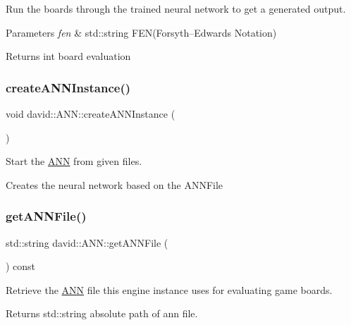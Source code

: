 Run the boards through the trained neural network to get a generated output.


\begin{DoxyParams}{Parameters}
{\em fen} & std\+::string F\+EN(Forsyth–\+Edwards Notation) \\
\hline
\end{DoxyParams}
\begin{DoxyReturn}{Returns}
int board evaluation 
\end{DoxyReturn}
\mbox{\label{classdavid_1_1ANN_ae5308d097ec9e78a740e24024dee5315}} 
\subsubsection{\texorpdfstring{create\+A\+N\+N\+Instance()}{createANNInstance()}}
{\footnotesize\ttfamily void david\+::\+A\+N\+N\+::create\+A\+N\+N\+Instance (\begin{DoxyParamCaption}{ }\end{DoxyParamCaption})}

Start the \hyperlink{classdavid_1_1ANN}{A\+NN} from given files.

Creates the neural network based on the A\+N\+N\+File \mbox{\label{classdavid_1_1ANN_aeef8f4fa5ab8fabf79db1351137322a6}} 
\subsubsection{\texorpdfstring{get\+A\+N\+N\+File()}{getANNFile()}}
{\footnotesize\ttfamily std\+::string david\+::\+A\+N\+N\+::get\+A\+N\+N\+File (\begin{DoxyParamCaption}{ }\end{DoxyParamCaption}) const}

Retrieve the \hyperlink{classdavid_1_1ANN}{A\+NN} file this engine instance uses for evaluating game boards. \begin{DoxyReturn}{Returns}
std\+::string absolute path of ann file. 
\end{DoxyReturn}
\mbox{\label{classdavid_1_1ANN_a13b9362aa75a05db1e1786d9ab28ca9e}} 
